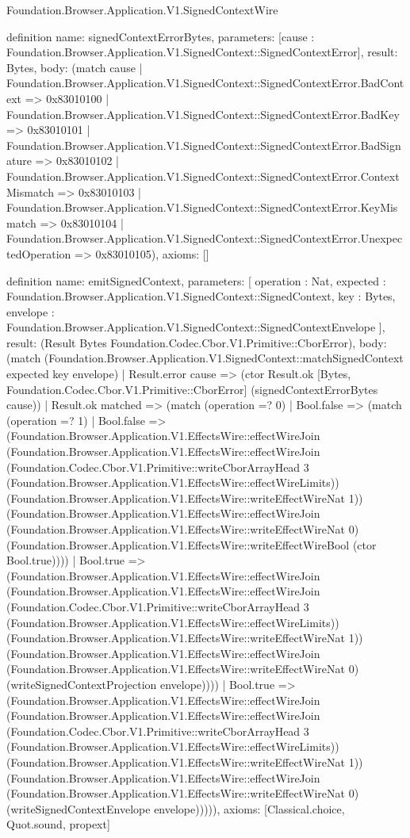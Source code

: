 \begin{lexlean}{Foundation.Browser.Application.V1.SignedContextWire}
\begin{semanticmodule}
definition{
  name: signedContextErrorBytes,
  parameters: [cause : Foundation.Browser.Application.V1.SignedContext::SignedContextError],
  result: Bytes,
  body: (match cause
    | Foundation.Browser.Application.V1.SignedContext::SignedContextError.BadContext => 0x83010100
    | Foundation.Browser.Application.V1.SignedContext::SignedContextError.BadKey => 0x83010101
    | Foundation.Browser.Application.V1.SignedContext::SignedContextError.BadSignature => 0x83010102
    | Foundation.Browser.Application.V1.SignedContext::SignedContextError.ContextMismatch => 0x83010103
    | Foundation.Browser.Application.V1.SignedContext::SignedContextError.KeyMismatch => 0x83010104
    | Foundation.Browser.Application.V1.SignedContext::SignedContextError.UnexpectedOperation => 0x83010105),
  axioms: []
}

definition{
  name: emitSignedContext,
  parameters: [
    operation : Nat,
    expected : Foundation.Browser.Application.V1.SignedContext::SignedContext,
    key : Bytes,
    envelope : Foundation.Browser.Application.V1.SignedContext::SignedContextEnvelope
  ],
  result: (Result Bytes Foundation.Codec.Cbor.V1.Primitive::CborError),
  body: (match (Foundation.Browser.Application.V1.SignedContext::matchSignedContext expected key envelope)
    | Result.error cause => (ctor Result.ok [Bytes, Foundation.Codec.Cbor.V1.Primitive::CborError] (signedContextErrorBytes cause))
    | Result.ok matched => (match (operation =? 0)
      | Bool.false => (match (operation =? 1)
        | Bool.false => (Foundation.Browser.Application.V1.EffectsWire::effectWireJoin (Foundation.Browser.Application.V1.EffectsWire::effectWireJoin (Foundation.Codec.Cbor.V1.Primitive::writeCborArrayHead 3 (Foundation.Browser.Application.V1.EffectsWire::effectWireLimits)) (Foundation.Browser.Application.V1.EffectsWire::writeEffectWireNat 1)) (Foundation.Browser.Application.V1.EffectsWire::effectWireJoin (Foundation.Browser.Application.V1.EffectsWire::writeEffectWireNat 0) (Foundation.Browser.Application.V1.EffectsWire::writeEffectWireBool (ctor Bool.true))))
        | Bool.true => (Foundation.Browser.Application.V1.EffectsWire::effectWireJoin (Foundation.Browser.Application.V1.EffectsWire::effectWireJoin (Foundation.Codec.Cbor.V1.Primitive::writeCborArrayHead 3 (Foundation.Browser.Application.V1.EffectsWire::effectWireLimits)) (Foundation.Browser.Application.V1.EffectsWire::writeEffectWireNat 1)) (Foundation.Browser.Application.V1.EffectsWire::effectWireJoin (Foundation.Browser.Application.V1.EffectsWire::writeEffectWireNat 0) (writeSignedContextProjection envelope))))
      | Bool.true => (Foundation.Browser.Application.V1.EffectsWire::effectWireJoin (Foundation.Browser.Application.V1.EffectsWire::effectWireJoin (Foundation.Codec.Cbor.V1.Primitive::writeCborArrayHead 3 (Foundation.Browser.Application.V1.EffectsWire::effectWireLimits)) (Foundation.Browser.Application.V1.EffectsWire::writeEffectWireNat 1)) (Foundation.Browser.Application.V1.EffectsWire::effectWireJoin (Foundation.Browser.Application.V1.EffectsWire::writeEffectWireNat 0) (writeSignedContextEnvelope envelope))))),
  axioms: [Classical.choice, Quot.sound, propext]
}


\end{semanticmodule}
\end{lexlean}
